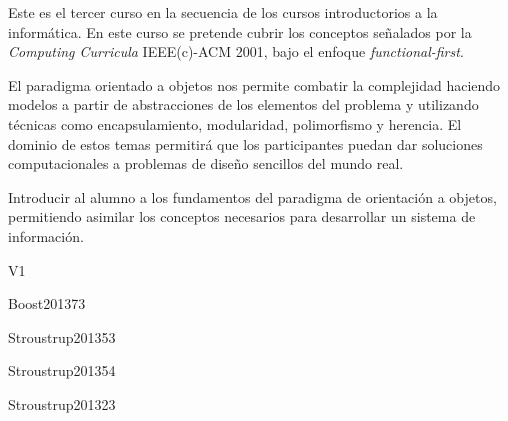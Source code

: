 \begin{syllabus}


\begin{justification}
Este es el tercer curso en la secuencia de los cursos introductorios a la informática. En este curso se pretende cubrir los conceptos señalados por la \textit{Computing Curricula} IEEE(c)-ACM 2001, bajo el enfoque \textit{functional-first}. 

El paradigma orientado a objetos nos permite combatir la
complejidad haciendo modelos a partir de abstracciones de los elementos del problema y utilizando técnicas como encapsulamiento,
modularidad, polimorfismo y herencia. El dominio de estos temas permitirá que los participantes puedan dar soluciones computacionales a problemas de diseño sencillos del mundo real.
\end{justification}

\begin{goals}
\item Introducir al alumno a los fundamentos del paradigma de orientación a objetos, permitiendo asimilar los conceptos necesarios para desarrollar un sistema de información.
\end{goals}

\begin{outcomes}{V1}
\end{outcomes}

\begin{unit}{\DSGraphsAndTreesDef}{}{Boost2013}{7}{3}
    \DSGraphsAndTreesAllTopics
    \DSGraphsAndTreesAllObjectives
\end{unit}

\begin{unit}{\PFFundamentalConstructsDef}{}{Stroustrup2013}{5}{3}
    \PFFundamentalConstructsAllTopics
    \PFFundamentalConstructsAllObjectives
\end{unit}

\begin{unit}{\PFAlgorithmsAndProblemSolvingDef}{}{Stroustrup2013}{5}{4}
    \PFAlgorithmsAndProblemSolvingAllTopics
    \PFAlgorithmsAndProblemSolvingAllObjectives
\end{unit}

\begin{unit}{\PFEventDrivenProgrammingDef}{}{Stroustrup2013}{2}{3}
   \PFEventDrivenProgrammingAllTopics
   \PFEventDrivenProgrammingAllObjectives
\end{unit}


\end{syllabus}

